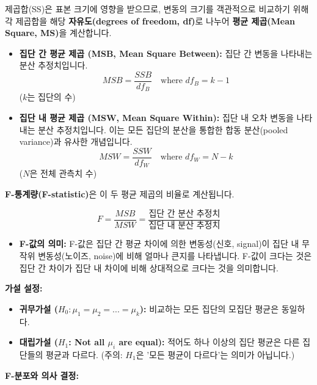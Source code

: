 \documentclass[
  letterpaper,
]{book}
\providecommand{\tightlist}{%
  \setlength{\itemsep}{0pt}\setlength{\parskip}{0pt}}
\begin{document}
제곱합(SS)은 표본 크기에 영향을 받으므로, 변동의 크기를 객관적으로
비교하기 위해 각 제곱합을 해당 \textbf{자유도(degrees of freedom, df)}로
나누어 \textbf{평균 제곱(Mean Square, MS)}을 계산합니다.

\begin{itemize}
\tightlist
\item
  \textbf{집단 간 평균 제곱 (MSB, Mean Square Between):} 집단 간 변동을
  나타내는 분산 추정치입니다.
  \[MSB = \frac{SSB}{df_B} \quad \text{where } df_B = k - 1\] (\(k\)는
  집단의 수)
\item
  \textbf{집단 내 평균 제곱 (MSW, Mean Square Within):} 집단 내 오차
  변동을 나타내는 분산 추정치입니다. 이는 모든 집단의 분산을 통합한 합동
  분산(pooled variance)과 유사한 개념입니다.
  \[MSW = \frac{SSW}{df_W} \quad \text{where } df_W = N - k\] (\(N\)은
  전체 관측치 수)
\end{itemize}

\textbf{F-통계량(F-statistic)}은 이 두 평균 제곱의 비율로 계산됩니다.

\[F = \frac{MSB}{MSW} = \frac{\text{집단 간 분산 추정치}}{\text{집단 내 분산 추정치}}\]

\begin{itemize}
\tightlist
\item
  \textbf{F-값의 의미:} F-값은 집단 간 평균 차이에 의한 변동성(신호,
  signal)이 집단 내 무작위 변동성(노이즈, noise)에 비해 얼마나 큰지를
  나타냅니다. F-값이 크다는 것은 집단 간 차이가 집단 내 차이에 비해
  상대적으로 크다는 것을 의미합니다.
\end{itemize}

\textbf{가설 설정:}

\begin{itemize}
\tightlist
\item
  \textbf{귀무가설 (\(H_0: \mu_1 = \mu_2 = ... = \mu_k\)):} 비교하는
  모든 집단의 모집단 평균은 동일하다.
\item
  \textbf{대립가설 (\(H_1\): Not all \(\mu_i\) are equal):} 적어도 하나
  이상의 집단 평균은 다른 집단들의 평균과 다르다. (주의: \(H_1\)은 '모든
  평균이 다르다'는 의미가 아닙니다.)
\end{itemize}

\textbf{F-분포와 의사 결정:}
\end{document}
